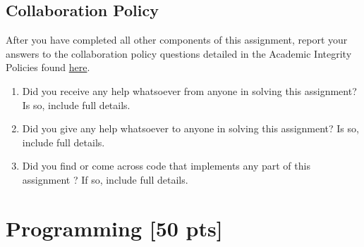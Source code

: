 \documentclass{article}
\begin{document}
\subsection{Collaboration Policy}
After you have completed all other components of this assignment, report your answers to the collaboration policy questions detailed in the Academic Integrity Policies found \href{http://www.cs.cmu.edu/~mgormley/courses/10601bd-f18/about.html#7-academic-integrity-policies}{here}.
    \begin{enumerate}
        \item Did you receive any help whatsoever from anyone in solving this assignment? Is so, include full details.
        \item Did you give any help whatsoever to anyone in solving this assignment? Is so, include full details.
        \item Did you find or come across code that implements any part of this assignment ? If so, include full details.
    \end{enumerate}

\begin{tcolorbox}[fit,height=10cm, width=17cm, blank, borderline={1pt}{-2pt}]
    \end{tcolorbox}

\clearpage


\section{Programming [50 pts]}
\label{programming}
\end{document}
